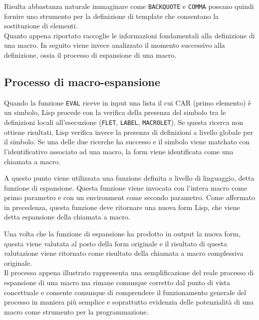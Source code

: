 Risulta abbastanza naturale immaginare come \texttt{BACKQUOTE} e
\texttt{COMMA} possano quindi fornire uno strumento per la definizione di
template che consentano la sostituzione di elementi.\\

Quanto appena riportato raccoglie le informazioni fondamentali alla
definizione di una macro. In seguito viene invece analizzato il momento
successivo alla definizione, ossia il processo di espansione di una macro.

\subsection{Processo di macro-espansione}

Quando la funzione \texttt{EVAL} riceve in input una lista il cui CAR (primo
elemento) è un simbolo, Lisp procede con la verifica della presenza del
simbolo tra le definizioni locali all’esecuzione (\texttt{FLET},
\texttt{LABEL}, \texttt{MACROLET}). Se questa ricerca non ottiene risultati,
Lisp verifica invece la presenza di definizioni a livello globale per il
simbolo. Se una delle due ricerche ha successo e il simbolo viene matchato con
l’identificativo associato ad una macro, la form viene identificata come una
chiamata a macro.

A questo punto viene utilizzata una funzione definita a livello di linguaggio,
detta funzione di espansione. Questa funzione viene invocata con l’intera
macro come primo parametro e con un environment come secondo parametro. Come
affermato in precedenza, questa funzione deve ritornare una nuova form Lisp,
che viene detta espansione della chiamata a macro.

Una volta che la funzione di espansione ha prodotto in output la nuova form,
questa viene valutata al posto della form originale e il risultato di questa
valutazione viene ritornato come risultato della chiamata a macro complessiva
originale.\\


Il processo appena illustrato rappresenta una semplificazione del reale
processo di espansione di una macro ma rimane comunque corretto dal punto di
vista concettuale e consente comunque di comprendere il funzionamento generale
del processo in maniera più semplice e soprattutto evidenzia delle
potenzialità di una macro come strumento per la programmazione.\\

